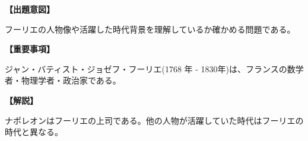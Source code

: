 \noindent \textbf{【出題意図】}

\noindent フーリエの人物像や活躍した時代背景を理解しているか確かめる問題である。

\vspace{1em}
\noindent \textbf{【重要事項】}

ジャン・バティスト・ジョゼフ・フーリエ(1768 年 - 1830年)は、フランスの数学者・物理学者・政治家である。

\vspace{1em}
\noindent \textbf{【解説】}

\noindent ナポレオンはフーリエの上司である。他の人物が活躍していた時代はフーリエの時代と異なる。
